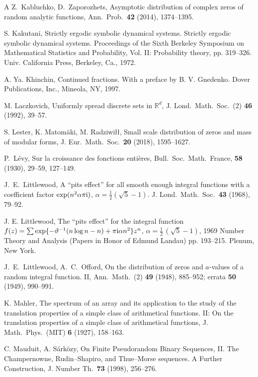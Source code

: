 \documentclass[11pt]{amsart}
\numberwithin{equation}{section}
\newcommand{\bR}{\mathbb R}
\begin{document}
\begin{thebibliography}{A}
 Z.~Kabluchko, D.~Zaporozhets,
Asymptotic distribution of complex zeros of random analytic
functions, Ann.\ Prob.\ {\bf 42} (2014), 1374--1395.

 S. Kakutani, Strictly ergodic symbolic dynamical systems.
Strictly ergodic symbolic dynamical systems.
Proceedings of the Sixth Berkeley Symposium on Mathematical Statistics and Probability,
Vol. II: Probability theory, pp. 319--326. Univ. California Press, Berkeley, Ca.,
1972.

 A. Ya. Khinchin, Continued fractions.  With a preface by B. V. Gnedenko.
Dover Publications, Inc., Mineola, NY, 1997.

 M. Laczkovich,
Uniformly spread discrete sets in $\bR^d$, J. Lond.\ Math.\ Soc.\ (2) {\bf 46} (1992), 39--57.

 S. Lester, K. Matom\"aki, M. Radziwi{\l}{\l},
Small scale distribution of zeros and mass of modular forms, J. Eur.\ Math.\ Soc.\ 
{\bf 20} (2018), 1595--1627.

 P.~L\'evy,
Sur la croissance des fonctions enti\`eres, 
Bull.\ Soc.\ Math.\ France, {\bf 58}  (1930),  29--59, 127--149.

J.~E.~Littlewood,
A ``pits effect'' for all smooth enough integral functions with a coefficient factor
$ \exp(n^2 \alpha\pi{\rm i})$, $\alpha = \frac12 (\sqrt5-1)$.
J. Lond.\  Math.\ Soc.\ {\bf 43} (1968), 79--92.

J. E. Littlewood,
The ``pits effect'' for the integral function \\
$ f(z) = \sum \exp\{ -\vartheta^{-1}(n\log n - n) + \pi {\rm i}\alpha n^2\}z^n$,
$\alpha = \frac12\, (\sqrt{5}-1) $, 
1969 Number Theory and Analysis (Papers in Honor of Edmund Landau) pp. 193--215.
Plenum, New York.

J.~E.~Littlewood, A.~C.~Offord,
On the distribution of zeros and $a$-values of a random integral function. II,
Ann.\ Math.\ (2) {\bf 49} (1948), 885--952; errata {\bf 50} (1949), 990--991.

 K. Mahler,
The spectrum of an array and its application to the study of the translation
properties of a simple class of arithmetical functions. II: On the translation properties of a
simple class of arithmetical functions, 
J. Math.\ Phys.\ (MIT) {\bf 6} (1927), 158--163.

C. Mauduit, A. S\'ark\"ozy,
On Finite Pseudorandom Binary Sequences, II.
The Champernowne, Rudin--Shapiro, and Thue--Morse sequences.
A Further Construction, 
J. Number Th.\ {\bf 73} (1998), 256--276.


\end{thebibliography}
\end{document}
